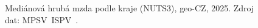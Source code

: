 \def\strProblemyRegionyTitle{\acs{geo-CZ}: mediánová mzda podle kraje (\acs{ISPV} 2025/H1, \acs{MPSV}/TREXIMA)}%
\def\strProblemyRegionyXlabel{Index (národní medián = 100)}%
\def\strProblemyRegionyCaption{Mediánová hrubá mzda podle kraje (NUTS3), \acs{geo-CZ}, 2025. Zdroj dat: \acs{MPSV}~\acs{ISPV}~\cite{mpsv_ispv}.}%
%
\begin{figure}[H]
  \centering
  \resizebox{\linewidth}{!}{}
  \caption{\strProblemyRegionyCaption}
  \label{fig:problemy_regiony}
\end{figure}
